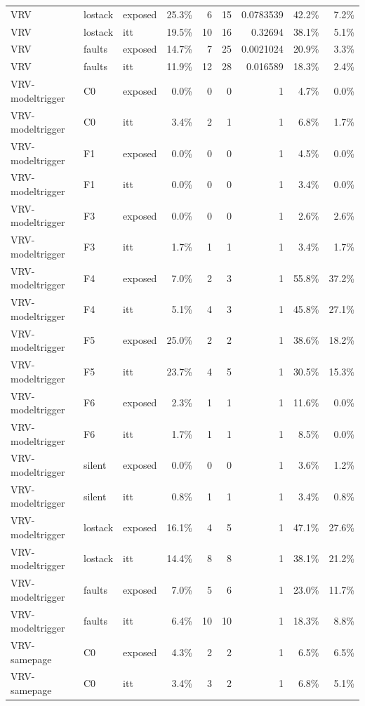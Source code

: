 \begin{tabular}{lllrrrrrr}
VRV & lostack & exposed & 25.3\% & 6 & 15 & 0.0783539 & 42.2\% & 7.2\% \\
VRV & lostack & itt & 19.5\% & 10 & 16 & 0.32694 & 38.1\% & 5.1\% \\
VRV & faults & exposed & 14.7\% & 7 & 25 & 0.0021024 & 20.9\% & 3.3\% \\
VRV & faults & itt & 11.9\% & 12 & 28 & 0.016589 & 18.3\% & 2.4\% \\
VRV-modeltrigger & C0 & exposed & 0.0\% & 0 & 0 & 1 & 4.7\% & 0.0\% \\
VRV-modeltrigger & C0 & itt & 3.4\% & 2 & 1 & 1 & 6.8\% & 1.7\% \\
VRV-modeltrigger & F1 & exposed & 0.0\% & 0 & 0 & 1 & 4.5\% & 0.0\% \\
VRV-modeltrigger & F1 & itt & 0.0\% & 0 & 0 & 1 & 3.4\% & 0.0\% \\
VRV-modeltrigger & F3 & exposed & 0.0\% & 0 & 0 & 1 & 2.6\% & 2.6\% \\
VRV-modeltrigger & F3 & itt & 1.7\% & 1 & 1 & 1 & 3.4\% & 1.7\% \\
VRV-modeltrigger & F4 & exposed & 7.0\% & 2 & 3 & 1 & 55.8\% & 37.2\% \\
VRV-modeltrigger & F4 & itt & 5.1\% & 4 & 3 & 1 & 45.8\% & 27.1\% \\
VRV-modeltrigger & F5 & exposed & 25.0\% & 2 & 2 & 1 & 38.6\% & 18.2\% \\
VRV-modeltrigger & F5 & itt & 23.7\% & 4 & 5 & 1 & 30.5\% & 15.3\% \\
VRV-modeltrigger & F6 & exposed & 2.3\% & 1 & 1 & 1 & 11.6\% & 0.0\% \\
VRV-modeltrigger & F6 & itt & 1.7\% & 1 & 1 & 1 & 8.5\% & 0.0\% \\
VRV-modeltrigger & silent & exposed & 0.0\% & 0 & 0 & 1 & 3.6\% & 1.2\% \\
VRV-modeltrigger & silent & itt & 0.8\% & 1 & 1 & 1 & 3.4\% & 0.8\% \\
VRV-modeltrigger & lostack & exposed & 16.1\% & 4 & 5 & 1 & 47.1\% & 27.6\% \\
VRV-modeltrigger & lostack & itt & 14.4\% & 8 & 8 & 1 & 38.1\% & 21.2\% \\
VRV-modeltrigger & faults & exposed & 7.0\% & 5 & 6 & 1 & 23.0\% & 11.7\% \\
VRV-modeltrigger & faults & itt & 6.4\% & 10 & 10 & 1 & 18.3\% & 8.8\% \\
VRV-samepage & C0 & exposed & 4.3\% & 2 & 2 & 1 & 6.5\% & 6.5\% \\
VRV-samepage & C0 & itt & 3.4\% & 3 & 2 & 1 & 6.8\% & 5.1\% \\

\end{tabular}

